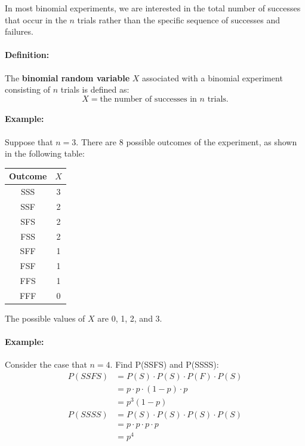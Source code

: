 In most binomial experiments, we are interested in the total number of successes that occur in the $n$ trials rather than the specific sequence of
 successes and failures.
\paragraph*{Definition:}
The \textbf{binomial random variable} $X$ associated with a binomial experiment consisting of $n$ trials is defined as:
\[
    X = \text{the number of successes in } n \text{ trials.}
\]

\paragraph*{Example:}
Suppose that $n=3$. There are 8 possible outcomes of the experiment, as shown in the following table:
\begin{center}
    \begin{tabular}{c|c}
        Outcome & $X$ \\
        \hline
        SSS & 3 \\
        SSF & 2 \\
        SFS & 2 \\
        FSS & 2 \\
        SFF & 1 \\
        FSF & 1 \\
        FFS & 1 \\
        FFF & 0 \\
    \end{tabular}
\end{center}
The possible values of $X$ are 0, 1, 2, and 3.

\paragraph*{Example:}
Consider the case that $n=4$. Find P(SSFS) and P(SSSS):
\begin{align*}
    P(SSFS) &= P(S) \cdot P(S) \cdot P(F) \cdot P(S) \\
    &= p \cdot p \cdot (1-p) \cdot p \\
    &= p^3(1-p)
    \\
    P(SSSS) &= P(S) \cdot P(S) \cdot P(S) \cdot P(S) \\
    &= p \cdot p \cdot p \cdot p \\
    &= p^4
\end{align*}

\pagebreak

